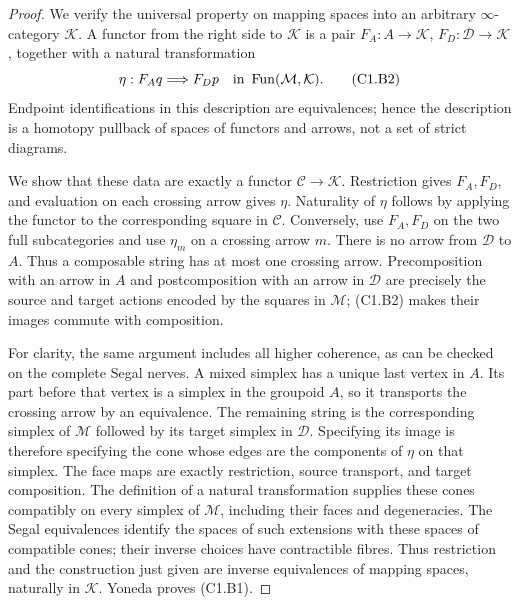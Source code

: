 \begin{proof}
We verify the universal property on mapping spaces into an arbitrary
$\infty$-category $\mathcal K$. A functor from the right side to
$\mathcal K$ is a pair $F_A:A\to\mathcal K$,
$F_D:\mathcal D\to\mathcal K$, together with a natural transformation
\[
 \eta:F_Aq\Longrightarrow F_Dp
       \quad\hbox{in }\operatorname{Fun}(\mathcal M,\mathcal K).
 \tag{C1.B2}
\]
Endpoint identifications in this description are equivalences; hence
the description is a homotopy pullback of spaces of functors and
arrows, not a set of strict diagrams.

We show that these data are exactly a functor $\mathcal C\to\mathcal K$.
Restriction gives $F_A,F_D$, and evaluation on each crossing arrow
gives $\eta$. Naturality of $\eta$ follows by applying the functor to
the corresponding square in $\mathcal C$.
Conversely, use $F_A,F_D$ on the two full subcategories and use
$\eta_m$ on a crossing arrow $m$. There is no arrow from
$\mathcal D$ to $A$. Thus a composable string has at most one
crossing arrow. Precomposition with an arrow in $A$ and
postcomposition with an arrow in $\mathcal D$ are precisely the
source and target actions encoded by the squares in $\mathcal M$;
(C1.B2) makes their images commute with composition.

For clarity, the same argument includes all higher coherence, as can
be checked on the complete Segal nerves. A mixed simplex has a unique
last vertex in $A$. Its part before that vertex is a simplex in the
groupoid $A$, so it transports the crossing arrow by an equivalence.
The remaining string is the corresponding simplex of $\mathcal M$
followed by its target simplex in $\mathcal D$. Specifying its image
is therefore specifying the cone whose edges are the components of
$\eta$ on that simplex. The face maps are exactly restriction,
source transport, and target composition. The definition of a
natural transformation supplies these cones compatibly on every
simplex of $\mathcal M$, including their faces and degeneracies.
The Segal equivalences identify the spaces of such extensions with
these spaces of compatible cones; their inverse choices have
contractible fibres. Thus restriction and the construction just
given are inverse equivalences of mapping spaces, naturally in
$\mathcal K$. Yoneda proves (C1.B1).
\end{proof}

